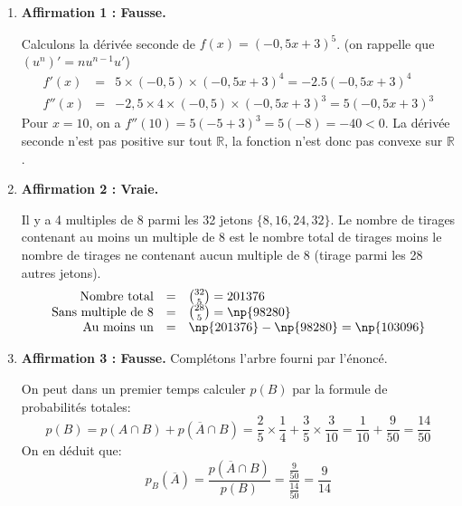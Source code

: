 \begin{enumerate}
\item \textbf{Affirmation 1 : Fausse.}

Calculons la dérivée seconde de $f(x) = (-0,5x + 3)^5$. (on rappelle que $(u^n)'=nu^{n-1}u'$)
\[
\begin{array}{rcl}
f'(x) &=& 5 \times (-0,5) \times (-0,5x + 3)^4 = -2.5(-0,5x + 3)^4 \\
f''(x) &=& -2,5 \times 4 \times (-0,5) \times (-0,5x + 3)^3 = 5(-0,5x + 3)^3
\end{array}
\]
Pour $x = 10$, on a $f''(10) = 5(-5 + 3)^3 = 5(-8) = -40 < 0$. La dérivée seconde n'est pas positive sur tout $\mathbb{R}$, la fonction n'est donc pas convexe sur $\mathbb{R}$.

\item \textbf{Affirmation 2 : Vraie.} 

Il y a 4 multiples de 8 parmi les 32 jetons $\{8, 16, 24, 32\}$.
Le nombre de tirages contenant au moins un multiple de 8 est le nombre total de tirages moins le nombre de tirages ne contenant aucun multiple de 8 (tirage parmi les 28 autres jetons).
\[
\begin{array}{rcl}
\text{Nombre total} &=& \binom{32}{5} = 201376 \\
\text{Sans multiple de 8} &=& \binom{28}{5} = \np{98280} \\
\text{Au moins un} &=& \np{201376} - \np{98280} = \np{103096}
\end{array}
\]

\item \textbf{Affirmation 3 : Fausse.} Complétons l'arbre fourni par l'énoncé.

\begin{center}
\end{center}
On peut dans un premier temps calculer $p(B)$ par la formule de probabilités totales:\[
p(B)= p(A \cap B) + p\left(\overline{A} \cap B\right) = \frac25 \times \frac14 + \frac35 \times \frac3{10} =\frac1{10}+\frac9{50}= \frac{14}{50}
\]
On en déduit que: \[
p_B\left(\overline{A}\right)=\frac{p\left(\overline{A} \cap B\right)}{p(B)} =\frac{\frac9{50}}{\frac{14}{50}} = \frac9{14}
\]



\end{enumerate}
